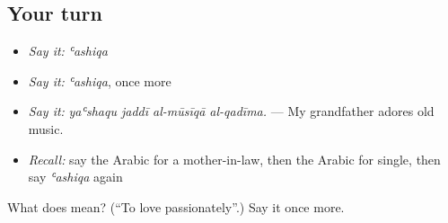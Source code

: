 \subsection*{Your turn}
\begin{itemize}
\raggedright
  \item \emph{Say it:} \emph{ʿashiqa}
  \item \emph{Say it:} \emph{ʿashiqa}, once more
  \item \emph{Say it:} \emph{yaʿshaqu jaddī al-mūsīqā al-qadīma.} — My grandfather adores old music.
  \item \emph{Recall:} say the Arabic for a mother-in-law, then the Arabic for single, then say \emph{ʿashiqa} again
\end{itemize}

\begin{tcolorbox}[breakable,colback=teal!4,colframe=teal!35!black,title={Before you move on}]
What does  mean? (\textquotedblleft{}To love passionately\textquotedblright{}.) Say it once more.
\end{tcolorbox}
